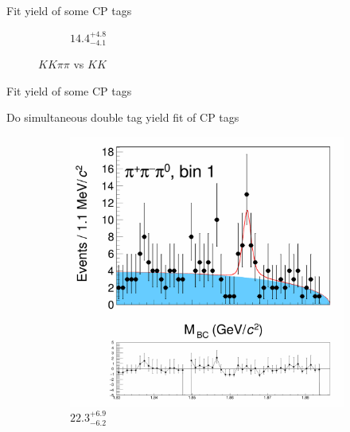 \documentclass{beamer}
\begin{document}
\begin{frame}{Fit yield of some CP tags}
\begin{figure}
\begin{subfigure}{0.49\textwidth}
      \caption{$14.4^{+4.8}_{-4.1}$}
    \end{subfigure}
    \caption{$KK\pi\pi$ vs $KK$}
  \end{figure}
\end{frame}

\begin{frame}{Fit yield of some CP tags}
  \begin{center}
    Do simultaneous double tag yield fit of CP tags
  \end{center}
  \begin{figure}
    \centering
    \begin{subfigure}{0.49\textwidth}
      \includegraphics[width = 1.0\textwidth, trim = {0 14cm 0 0}, clip = true]{Plots/DoubleTagYield_DoubleTag_CP_KKpipi_vs_pipipi0_SignalBin1.png}
      \caption{$22.3^{+6.9}_{-6.2}$}
    \end{subfigure}%
    \begin{subfigure}{0.49\textwidth}

\end{subfigure}
\end{figure}
\end{frame}
\end{document}

